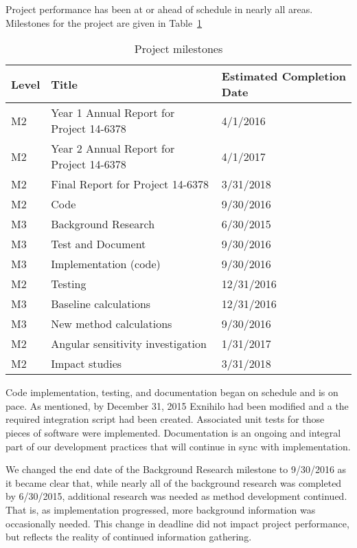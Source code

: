\documentclass[12pt]{article}
\begin{document}
Project performance has been at or ahead of schedule in nearly all areas. 
Milestones for the project are given in Table~\ref{tab:milestones}
\begin{table}[h!]
\begin{center}
\caption{Project milestones}
\begin{tabular}{ | l | l | l | }
\hline
	\textbf{Level} & \textbf{Title} & \textbf{Estimated Completion Date} \\ \hline
	M2 & Year 1 Annual Report for Project 14-6378 & 4/1/2016 \\ \hline
	M2 & Year 2 Annual Report for Project 14-6378 & 4/1/2017 \\ \hline
	M2 & Final Report for Project 14-6378 & 3/31/2018 \\ \hline
	M2 & Code & 9/30/2016 \\ \hline
	M3 & \hspace*{1em} Background Research & 6/30/2015 \\ \hline
	M3 & \hspace*{1em} Test and Document & 9/30/2016 \\ \hline
	M3 & \hspace*{1em} Implementation (code) & 9/30/2016 \\ \hline	
	M2 & Testing & 12/31/2016 \\ \hline
	M3 & \hspace*{1em} Baseline calculations & 12/31/2016 \\ \hline
	M3 & \hspace*{1em} New method calculations & 9/30/2016 \\ \hline
	M2 & Angular sensitivity investigation & 1/31/2017 \\ \hline
	M2 & Impact studies & 3/31/2018 \\ \hline
\end{tabular}
\label{tab:milestones}
\end{center}
\end{table}

Code implementation, testing, and documentation began on schedule and is on pace. As mentioned, by December 31, 2015 Exnihilo had been modified and a the required integration script had been created. Associated unit tests for those pieces of software were implemented. Documentation is an ongoing and integral part of our development practices that will continue in sync with implementation. 

We changed the end date of the Background Research milestone to 9/30/2016 as it became clear that, while nearly all of the background research was completed by 6/30/2015, additional research was needed as method development continued.
That is, as implementation progressed, more background information was occasionally needed. 
This change in deadline did not impact project performance, but reflects the reality of continued information gathering.
\end{document}
